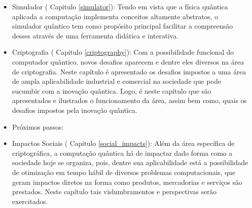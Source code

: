 \begin{itemize}
  \item Simulador ( Capitulo \ref{simulator}): Tendo em vista que a física quântica aplicada a computação implementa conceitos altamente abstratos, o simulador quântico tem como propósito principal facilitar a compreensão desses através de uma ferramenta didática e interativa.
  \item Criptografia ( Capitulo \ref{criptography}): Com a possibilidade funcional do computador quântico, novos desafios aparecem e dentre eles diversos na área de criptografia. Neste capítulo é apresentado os desafios impostos a uma área de ampla aplicabilidade industrial e comercial na sociedade que pode sucumbir com a inovação quântica. Logo, é neste capítulo que são apresentados e ilustrados o funcionamento da área, assim bem como, quais os desafios impostos pela inovação quântica.
  \item Próximos passos: 
  \item Impactos Sociais ( Capitulo \ref{social_impacts}): Além da área específica de criptográfica, a computação quântica há de impactar dado forma como a sociedade hoje se organiza, pois, dentre sua aplicabilidade está a possibilidade de otimização em tempo hábil de diversos problemas computacionais, que geram impactos diretos na forma como produtos, mercadorias e serviços são prestados. Neste capítulo tais vislumbramentos e perspectivas serão exercitados.
\end{itemize}

\newpage

